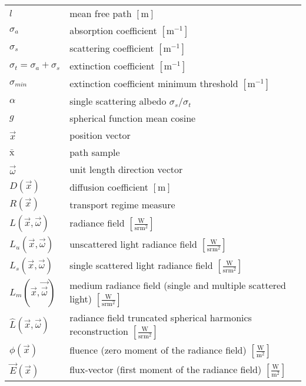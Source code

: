 \begin{flushleft}
\renewcommand*{\arraystretch}{1.75}
\begin{longtable}[c]{@{}p{28.5mm}@{} p{120.5mm}}
	$l$	&  mean free path $\left[\si{\meter}\right]$\\
	$\sigma_a$	&  absorption coefficient $\left[\si{\meter}^{-1}\right]$
	\\
	$\sigma_s$	&  scattering coefficient $\left[\si{\meter}^{-1}\right]$
	\\
	$\sigma_t=\sigma_a+\sigma_s$	&  extinction coefficient $\left[\si{\meter}^{-1}\right]$
	\\
	$\sigma_{min}$	&  extinction coefficient minimum threshold $\left[\si{\meter}^{-1}\right]$
	\\
	$\alpha$	&  single scattering albedo $\sigma_s/\sigma_t$
	\\
	$g$	&  spherical function mean cosine
	\\
	$\vec{x}$	&  position vector
	\\
	$\bar{\mathrm{x}}$	&  path sample
	\\
	$\vec{\omega}$	&  unit length direction vector
	\\
	$D\left(\vec{x}\right)$	&  diffusion coefficient $\left[\si{\meter}\right]$
	\\
	$R\left(\vec{x}\right)$	&  transport regime measure
	\\
	$L\left(\vec{x}, \vec{\omega}\right)$	&  radiance field $\left[\frac{\si{\watt}}{\si{\steradian} \si{\meter}^2}\right]$
	\\
	$L_u\left(\vec{x}, \vec{\omega}\right)$	&  unscattered light radiance field $\left[\frac{\si{\watt}}{\si{\steradian} \si{\meter}^2}\right]$
	\\
	$L_s\left(\vec{x}, \vec{\omega}\right)$	&  single scattered light radiance field $\left[\frac{\si{\watt}}{\si{\steradian} \si{\meter}^2}\right]$
	\\
	$L_m\left(\vec{x}, \vec{\vec{\omega}}\right)$	&  medium radiance field (single and multiple scattered light) $\left[\frac{\si{\watt}}{\si{\steradian} \si{\meter}^2}\right]$
	\\
	$\widehat{L}\left(\vec{x}, \vec{\omega}\right)$	&  radiance field truncated spherical harmonics reconstruction $\left[\frac{\si{\watt}}{\si{\steradian} \si{\meter}^2}\right]$
	\\
	$\phi\left(\vec{x}\right)$	&  fluence (zero moment of the radiance field) $\left[\frac{\si{\watt}}{\si{\meter}^2}\right]$
	\\
	$\vec{E}\left(\vec{x}\right)$	&  flux-vector (first moment of the radiance field) $\left[\frac{\si{\watt}}{\si{\meter}^2}\right]$

\end{longtable}
\end{flushleft}

